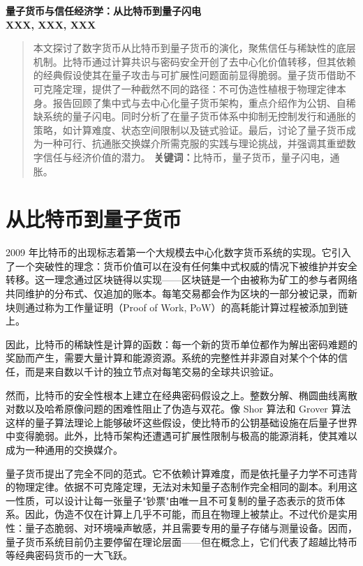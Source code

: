 \documentclass[a4paper,10.5pt,twoside]{article}
\begin{document}
\begin{center}
\LARGE
\textbf{量子货币与信任经济学：从比特币到量子闪电}\\[11pt]
\normalsize
\textbf {XXX, XXX, XXX}\\[4pt]
\end{center}

\begin{abstract}
\normalsize
本文探讨了数字货币从比特币到量子货币的演化，聚焦信任与稀缺性的底层机制。比特币通过计算共识与密码安全开创了去中心化价值转移，但其依赖的经典假设使其在量子攻击与可扩展性问题面前显得脆弱。量子货币借助不可克隆定理，提供了一种截然不同的路径：不可伪造性植根于物理定律本身。报告回顾了集中式与去中心化量子货币架构，重点介绍作为公钥、自稀缺系统的量子闪电。同时分析了在量子货币体系中抑制无控制发行和通胀的策略，如计算难度、状态空间限制以及链式验证。最后，讨论了量子货币成为一种可行、抗通胀交换媒介所需克服的实践与理论挑战，并强调其重塑数字信任与经济价值的潜力。
\vskip 2mm
\textbf{关键词：}比特币，量子货币，量子闪电，通胀。
\end{abstract}

\section{从比特币到量子货币}\label{s:1}

2009 年比特币的出现\autocite{Nakamoto_2008}标志着第一个大规模去中心化数字货币系统的实现。它引入了一个突破性的理念：货币价值可以在没有任何集中式权威的情况下被维护并安全转移。这一理念通过区块链得以实现——区块链是一个由被称为矿工的参与者网络共同维护的分布式、仅追加的账本。每笔交易都会作为区块的一部分被记录，而新块则通过称为工作量证明（Proof of Work, PoW）的高耗能计算过程被添加到链上。

因此，比特币的稀缺性是计算的函数：每一个新的货币单位都作为解出密码难题的奖励而产生，需要大量计算和能源资源。系统的完整性并非源自对某个个体的信任，而是来自数以千计的独立节点对每笔交易的全球共识验证。

然而，比特币的安全性根本上建立在经典密码假设之上。整数分解、椭圆曲线离散对数以及哈希原像问题的困难性阻止了伪造与双花。像 Shor 算法\autocite{Shor_1997}和 Grover 算法\autocite{Grover_1996}这样的量子算法理论上能够破坏这些假设，使比特币的公钥基础设施在后量子世界中变得脆弱。此外，比特币架构还遭遇可扩展性限制与极高的能源消耗，使其难以成为一种通用的交换媒介。

量子货币提出了完全不同的范式。它不依赖计算难度，而是依托量子力学不可违背的物理定律。依据不可克隆定理，\autocite{Nielsen_Chuang_2010}无法对未知量子态制作完全相同的副本。利用这一性质，可以设计让每一张量子"钞票"由唯一且不可复制的量子态表示的货币体系。因此，伪造不仅在计算上几乎不可能，而且在物理上被禁止。不过代价是实用性：量子态脆弱、对环境噪声敏感，并且需要专用的量子存储与测量设备。因而，量子货币系统目前仍主要停留在理论层面——但在概念上，它们代表了超越比特币等经典密码货币的一大飞跃。
\end{document}
